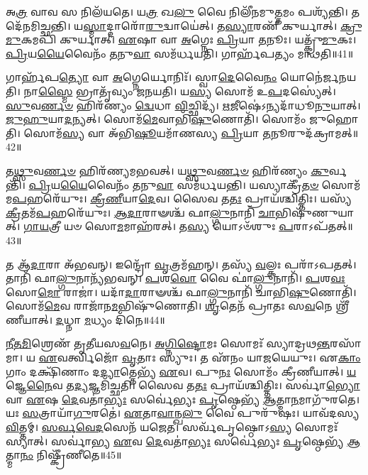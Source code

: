 𑌅\-\ul{𑌤𑍍𑌰} 𑌵𑌾𑌵 𑌸 𑌨𑌿𑌲᳴𑌯𑌤𑍇।
𑌯\-\ul{𑌤𑍍𑌰} 𑌖\-\ul{𑌲𑍁} 𑌵𑍈 𑌨𑌿𑌲𑍀᳴𑌨𑌮𑍁\-\ul{𑌤𑍍𑌤}\-𑌮𑌂 𑌪𑌶𑍍𑌯᳴𑌨𑍍𑌤𑌿।
𑌤𑌦𑍇᳴𑌨𑌮𑌿𑌚𑍍𑌛𑌨𑍍𑌤𑌿।
𑌯\-\ul{𑌸𑍍𑌮𑌾}\-𑌦𑍍𑌦𑌾𑌰𑍋᳴\-\ul{𑌰𑍁}\-𑌦𑍍𑌵𑌾𑌯𑍇॑𑌤𑍍।
𑌤\-\ul{𑌸𑍍𑌯𑌾}\-𑌰𑌣𑍀᳴ 𑌕𑍁𑌰𑍍𑌯𑌾𑌤𑍍।
\-\ul{𑌕𑍍𑌰𑍁}\-\-\ul{𑌮𑍁}\-𑌕𑌮𑌪𑌿᳴ 𑌕𑍁𑌰𑍍𑌯𑌾𑌤𑍍।
\-\ul{𑌏}\-𑌷𑌾 𑌵𑌾 \ul{𑌅}\-𑌗𑍍𑌨𑍇𑌃 \ul{𑌪𑍍𑌰𑌿}\-𑌯𑌾 \ul{𑌤}\-𑌨𑍂𑌃।
𑌯𑌤𑍍𑌕𑍍𑌰𑍁᳴\-\ul{𑌮𑍁}\-𑌕𑌃।
\-\ul{𑌪𑍍𑌰𑌿}\-𑌯\-\ul{𑌯𑍈}\-𑌵𑍈𑌨𑌂᳴ \ul{𑌤}\-𑌨𑍁\-\ul{𑌵𑌾} 𑌸𑌮᳴𑌰𑍍𑌧𑌯𑌤𑌿।
𑌗𑌾𑌰𑍍\mbox{}𑌹᳴𑌪𑌤𑍍𑌯𑌂 𑌮𑌨𑍍𑌥𑌤𑌿॥41॥

𑌗𑌾𑌰𑍍\mbox{}𑌹᳴𑌪\-\ul{𑌤𑍍𑌯𑍋} 𑌵𑌾 \ul{𑌅}\-𑌗𑍍𑌨𑍇𑌰𑍍𑌯𑍋𑌨𑌿𑌃᳴।
𑌸𑍍𑌵𑌾\-\ul{𑌦𑍇}\-𑌵𑍈\-\ul{𑌨𑌂} 𑌯𑍋𑌨𑍇॑𑌰𑍍𑌜𑌨𑌯𑌤𑌿।
𑌨𑌾\-\ul{𑌸𑍍𑌮𑍈} 𑌭𑍍𑌰𑌾𑌤𑍃᳴𑌵𑍍𑌯𑌂 𑌜𑌨𑌯𑌤𑌿।
𑌯\-\ul{𑌸𑍍𑌯} 𑌸𑍋𑌮᳴ 𑌉\-\ul{𑌪}\-𑌦𑌸𑍍𑌯𑍇॑𑌤𑍍।
\-\ul{𑌸𑍁}\-𑌵\-\ul{𑌰𑍍𑌣}\-\-\ul{𑍞} 𑌹𑌿𑌰᳴𑌣𑍍𑌯𑌂 \ul{𑌦𑍍𑌵𑍇}\-𑌧𑌾 \ul{𑌵𑌿}\-𑌚𑍍𑌛𑌿𑌦𑍍𑌯᳴।
\-\ul{𑌋}\-\-\ul{𑌜𑍀}\-𑌷𑍇॑\-𑌽𑌨𑍍𑌯𑌦𑌾᳴𑌧𑍂\-\ul{𑌨𑍁}\-𑌯𑌾𑌤𑍍।
\-\ul{𑌜𑍁}\-\-\ul{𑌹𑍁}\-𑌯𑌾\-\ul{𑌦}\-𑌨𑍍𑌯𑌤𑍍।
𑌸𑍋𑌮᳴\-\ul{𑌮𑍇}\-𑌵𑌾𑌭𑌿᳴\-\ul{𑌷𑍁}\-𑌣𑍋𑌤𑌿᳴।
𑌸𑍋𑌮𑌂᳴ 𑌜𑍁𑌹𑍋𑌤𑌿।
𑌸𑍋𑌮᳴\-\ul{𑌸𑍍𑌯} 𑌵𑌾 𑌅᳴𑌭𑌿\-\ul{𑌷𑍂}\-𑌯𑌮𑌾᳴𑌣𑌸𑍍𑌯 \ul{𑌪𑍍𑌰𑌿}\-𑌯𑌾 \ul{𑌤}\-𑌨𑍂𑌰𑍁𑌦᳴𑌕𑍍𑌰𑌾𑌮𑌤𑍍॥42॥

𑌤\-\ul{𑌥𑍍𑌸𑍁}\-𑌵\-\ul{𑌰𑍍𑌣}\-\-\ul{𑍞} 𑌹𑌿𑌰᳴𑌣𑍍𑌯𑌮𑌭𑌵𑌤𑍍।
𑌯\-\ul{𑌥𑍍𑌸𑍁}\-𑌵\-\ul{𑌰𑍍𑌣}\-\-\ul{𑍞} 𑌹𑌿𑌰᳴𑌣𑍍𑌯𑌂 \ul{𑌕𑍁}\-𑌰𑍍𑌵𑌨𑍍𑌤𑌿᳴।
\-\ul{𑌪𑍍𑌰𑌿}\-𑌯\-\ul{𑌯𑍈}\-𑌵𑍈𑌨𑌂᳴ \ul{𑌤}\-𑌨𑍁\-\ul{𑌵𑌾} 𑌸𑌮᳴𑌰𑍍𑌧𑌯𑌨𑍍𑌤𑌿।
𑌯𑌸𑍍𑌯𑌾𑌕𑍍𑌰𑍀᳴\-\ul{𑌤}\-\-\ul{𑍞} 𑌸𑍋𑌮᳴𑌮\-\ul{𑌪}\-𑌹𑌰𑍇᳴𑌯𑍁𑌃।
\-\ul{𑌕𑍍𑌰𑍀}\-\-\ul{𑌣𑍀}\-𑌯𑌾\-\ul{𑌦𑍇}\-𑌵।
𑌸𑍈𑌵 𑌤\-\ul{𑌤𑌃} 𑌪𑍍𑌰𑌾𑌯᳴𑌶𑍍𑌚𑌿𑌤𑍍𑌤𑌿𑌃।
𑌯𑌸𑍍𑌯᳴ \ul{𑌕𑍍𑌰𑍀}\-𑌤𑌮᳴\-\ul{𑌪}\-𑌹𑌰𑍇᳴𑌯𑍁𑌃।
\-\ul{𑌆}\-\-\ul{𑌦𑌾}\-𑌰𑌾𑍟𑌶𑍍𑌚᳴ 𑌫𑌾\-\ul{𑌲𑍍𑌗𑍁}\-𑌨𑌾𑌨𑌿᳴ \ul{𑌚𑌾}\-𑌭𑌿𑌷𑍁᳴𑌣𑍁𑌯𑌾𑌤𑍍।
\-\ul{𑌗𑌾}\-\-\ul{𑌯}\-𑌤𑍍𑌰𑍀 𑌯𑍞 𑌸𑍋\-\ul{𑌮}\-𑌮𑌾𑌹᳴𑌰𑌤𑍍।
𑌤\-\ul{𑌸𑍍𑌯} 𑌯𑍋𑌽𑍞᳴𑌶𑍁𑌃 \ul{𑌪}\-𑌰𑌾\-𑌽𑌪᳴𑌤𑌤𑍍॥43॥

𑌤 𑌆᳴\-\ul{𑌦𑌾}\-𑌰𑌾 𑌅᳴𑌭𑌵𑌨𑍍।
𑌇𑌨𑍍𑌦𑍍𑌰𑍋᳴ \ul{𑌵𑍃}\-𑌤𑍍𑌰𑌮᳴𑌹𑌨𑍍।
𑌤𑌸𑍍𑌯᳴ \ul{𑌵}\-𑌲𑍍𑌕𑌃 𑌪𑌰𑌾᳴\-𑌽𑌪𑌤𑌤𑍍।
𑌤𑌾𑌨𑌿᳴ 𑌫𑌾\-\ul{𑌲𑍍𑌗𑍁}\-𑌨𑌾𑌨𑍍𑌯᳴𑌭𑌵𑌨𑍍।
\-\ul{𑌪}\-𑌶\-\ul{𑌵𑍋} 𑌵𑍈 𑌫𑌾॑\-\ul{𑌲𑍍𑌗𑍁}\-𑌨𑌾𑌨𑌿᳴।
\-\ul{𑌪}\-𑌶\-\ul{𑌵𑌃} 𑌸𑍋\-\ul{𑌮𑍋} 𑌰𑌾𑌜𑌾॑।
𑌯𑌦𑌾᳴\-\ul{𑌦𑌾}\-𑌰𑌾𑍟𑌶𑍍𑌚᳴ 𑌫𑌾\-\ul{𑌲𑍍𑌗𑍁}\-𑌨𑌾𑌨𑌿᳴ 𑌚𑌾𑌭𑌿\-\ul{𑌷𑍁}\-𑌣𑍋𑌤𑌿᳴।
𑌸𑍋𑌮᳴\-\ul{𑌮𑍇}\-𑌵 𑌰𑌾𑌜𑌾᳴𑌨\-\ul{𑌮}\-𑌭𑌿𑌷𑍁᳴𑌣𑍋𑌤𑌿।
\-\ul{𑌶𑍃}\-𑌤𑍇𑌨᳴ 𑌪𑍍𑌰𑌾𑌤𑌃 𑌸\-\ul{𑌵}\-𑌨𑍇 𑌶𑍍𑌰𑍀᳴𑌣𑍀𑌯𑌾𑌤𑍍।
\-\ul{𑌦}\-𑌧𑍍𑌨𑌾 \ul{𑌮}\-𑌧𑍍𑌯𑌂 𑌦𑌿᳴𑌨𑍇॥44॥

\-\ul{𑌨𑍀}\-\-\ul{𑌤}\-\-\ul{𑌮𑌿}\-𑌶𑍍𑌰𑍇𑌣᳴ 𑌤𑍃𑌤𑍀𑌯𑌸\-\ul{𑌵}\-𑌨𑍇।
\-\ul{𑌅}\-\-\ul{𑌗𑍍𑌨𑌿}\-\-\ul{𑌷𑍍𑌟𑍋}\-𑌮𑌃 𑌸𑍋𑌮𑌃᳴ 𑌸𑍍𑌯𑌾𑌦𑍍𑌰𑌥\-\ul{𑌨𑍍𑌤}\-𑌰\-𑌸𑌾᳴𑌮𑌾।
𑌯 \ul{𑌏}\-𑌵𑌰𑍍𑌤𑍍𑌵𑌿𑌜𑍋᳴ \ul{𑌵𑍃}\-𑌤𑌾𑌃 𑌸𑍍𑌯𑍁𑌃।
𑌤 𑌏᳴𑌨𑌂 𑌯𑌾𑌜𑌯𑍇𑌯𑍁𑌃।
𑌏\-\ul{𑌕𑌾𑌂} 𑌗𑌾𑌂 𑌦𑌕𑍍𑌷𑌿᳴𑌣𑌾𑌂 𑌦\-\ul{𑌦𑍍𑌯𑌾}\-𑌤𑍍𑌤𑍇𑌭𑍍𑌯᳴ \ul{𑌏}\-𑌵।
𑌪𑍁\-\ul{𑌨𑌃} 𑌸𑍋𑌮𑌂᳴ 𑌕𑍍𑌰𑍀𑌣𑍀𑌯𑌾𑌤𑍍।
\-\ul{𑌯}\-𑌜𑍍𑌞𑍇\-\ul{𑌨𑍈}\-𑌵 𑌤\-\ul{𑌦𑍍𑌯}\-𑌜𑍍𑌞𑌮𑌿᳴𑌚𑍍𑌛𑌤𑌿।
𑌸𑍈𑌵 𑌤\-\ul{𑌤𑌃} 𑌪𑍍𑌰𑌾𑌯᳴𑌶𑍍𑌚𑌿𑌤𑍍𑌤𑌿𑌃।
𑌸𑌰𑍍𑌵𑌾॑\-\ul{𑌭𑍍𑌯𑍋} 𑌵𑌾 \ul{𑌏}\-𑌷 \ul{𑌦𑍇}\-𑌵𑌤𑌾॑\-\ul{𑌭𑍍𑌯𑌃} 𑌸𑌰𑍍𑌵𑍇॑𑌭𑍍𑌯𑌃 \ul{𑌪𑍃}\-𑌷𑍍𑌠𑍇𑌭𑍍𑌯᳴ \ul{𑌆}\-𑌤𑍍𑌮𑌾\-\ul{𑌨}\-𑌮𑌾𑌗𑍁᳴𑌰𑌤𑍇।
𑌯𑌃 \ul{𑌸}\-𑌤𑍍𑌰𑌾𑌯𑌾᳴\-\ul{𑌗𑍁}\-𑌰𑌤𑍇॑।
\-\ul{𑌏}\-𑌤𑌾\-\ul{𑌵𑌾}\-𑌨𑍍𑌖\-\ul{𑌲𑍁} 𑌵𑍈 𑌪𑍁𑌰𑍁᳴𑌷𑌃।
𑌯𑌾𑌵᳴𑌦𑌸𑍍𑌯 \ul{𑌵𑌿}\-𑌤𑍍𑌤𑌮𑍍।
\-\ul{𑌸}\-\-\ul{𑌰𑍍𑌵}\-\-\ul{𑌵𑍇}\-\-\ul{𑌦}\-𑌸𑍇𑌨᳴ 𑌯𑌜𑍇𑌤।
𑌸𑌰𑍍𑌵᳴𑌪𑍃𑌷𑍍𑌠𑍋\-𑌽\-\ul{𑌸𑍍𑌯} 𑌸𑍋𑌮𑌃᳴ 𑌸𑍍𑌯𑌾𑌤𑍍।
𑌸𑌰𑍍𑌵𑌾॑𑌭𑍍𑌯 \ul{𑌏}\-𑌵 \ul{𑌦𑍇}\-𑌵𑌤𑌾॑\-\ul{𑌭𑍍𑌯𑌃} 𑌸𑌰𑍍𑌵𑍇॑𑌭𑍍𑌯𑌃 \ul{𑌪𑍃}\-𑌷𑍍𑌠𑍇𑌭𑍍𑌯᳴ \ul{𑌆}\-𑌤𑍍𑌮𑌾\-\ul{𑌨𑌂} 𑌨𑌿𑌷𑍍𑌕𑍍𑌰𑍀᳴𑌣𑍀𑌤𑍇॥45॥\anuvakamend[\-\ul{𑌉}\-𑌦𑍍𑌵𑌾𑌯᳴𑌤𑌿 𑌮𑌨𑍍𑌥𑍇𑌨𑍍𑌮𑌨𑍍𑌥𑌤𑍍𑌯𑌕𑍍𑌰𑌾𑌮\-\ul{𑌤𑍍𑌪}\-𑌰𑌾\-𑌽𑌪᳴𑌤\-\ul{𑌨𑍍𑌮}\-𑌧𑍍𑌯𑌨𑍍𑌦𑌿᳴𑌨 𑌆\-\ul{𑌗𑍁}\-𑌰\-\ul{𑌤𑍇} 𑌪𑌞𑍍𑌚᳴ 𑌚]

